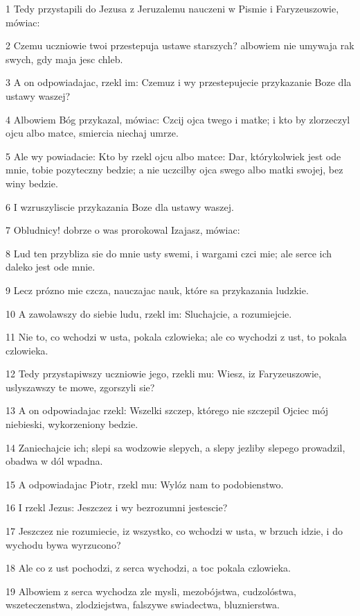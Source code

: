 \par 1 Tedy przystapili do Jezusa z Jeruzalemu nauczeni w Pismie i Faryzeuszowie, mówiac:
\par 2 Czemu uczniowie twoi przestepuja ustawe starszych? albowiem nie umywaja rak swych, gdy maja jesc chleb.
\par 3 A on odpowiadajac, rzekl im: Czemuz i wy przestepujecie przykazanie Boze dla ustawy waszej?
\par 4 Albowiem Bóg przykazal, mówiac: Czcij ojca twego i matke; i kto by zlorzeczyl ojcu albo matce, smiercia niechaj umrze.
\par 5 Ale wy powiadacie: Kto by rzekl ojcu albo matce: Dar, którykolwiek jest ode mnie, tobie pozyteczny bedzie; a nie uczcilby ojca swego albo matki swojej, bez winy bedzie.
\par 6 I wzruszyliscie przykazania Boze dla ustawy waszej.
\par 7 Obludnicy! dobrze o was prorokowal Izajasz, mówiac:
\par 8 Lud ten przybliza sie do mnie usty swemi, i wargami czci mie; ale serce ich daleko jest ode mnie.
\par 9 Lecz prózno mie czcza, nauczajac nauk, które sa przykazania ludzkie.
\par 10 A zawolawszy do siebie ludu, rzekl im: Sluchajcie, a rozumiejcie.
\par 11 Nie to, co wchodzi w usta, pokala czlowieka; ale co wychodzi z ust, to pokala czlowieka.
\par 12 Tedy przystapiwszy uczniowie jego, rzekli mu: Wiesz, iz Faryzeuszowie, uslyszawszy te mowe, zgorszyli sie?
\par 13 A on odpowiadajac rzekl: Wszelki szczep, którego nie szczepil Ojciec mój niebieski, wykorzeniony bedzie.
\par 14 Zaniechajcie ich; slepi sa wodzowie slepych, a slepy jezliby slepego prowadzil, obadwa w dól wpadna.
\par 15 A odpowiadajac Piotr, rzekl mu: Wylóz nam to podobienstwo.
\par 16 I rzekl Jezus: Jeszczez i wy bezrozumni jestescie?
\par 17 Jeszczez nie rozumiecie, iz wszystko, co wchodzi w usta, w brzuch idzie, i do wychodu bywa wyrzucono?
\par 18 Ale co z ust pochodzi, z serca wychodzi, a toc pokala czlowieka.
\par 19 Albowiem z serca wychodza zle mysli, mezobójstwa, cudzolóstwa, wszeteczenstwa, zlodziejstwa, falszywe swiadectwa, bluznierstwa.
